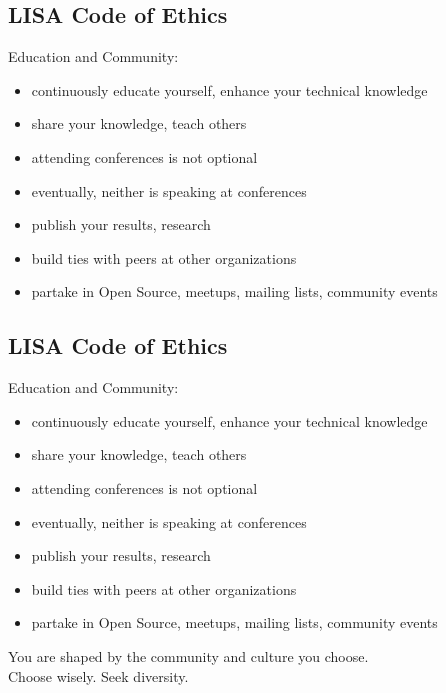 \documentclass[xga]{xdvislides}
\begin{document}
\subsection{LISA Code of Ethics}
Education and Community:
\begin{itemize}
	\item continuously educate yourself, enhance your technical knowledge
	\item share your knowledge, teach others
	\item attending conferences is not optional
	\item eventually, neither is speaking at conferences
	\item publish your results, research
	\item build ties with peers at other organizations
	\item partake in Open Source, meetups, mailing lists, community events
\end{itemize}

\subsection{LISA Code of Ethics}
Education and Community:
\begin{itemize}
	\item continuously educate yourself, enhance your technical knowledge
	\item share your knowledge, teach others
	\item attending conferences is not optional
	\item eventually, neither is speaking at conferences
	\item publish your results, research
	\item build ties with peers at other organizations
	\item partake in Open Source, meetups, mailing lists, community events
\end{itemize}
\vspace{.25in}
You are shaped by the community and culture you choose. \\
Choose wisely.  Seek diversity. \\
\end{document}
